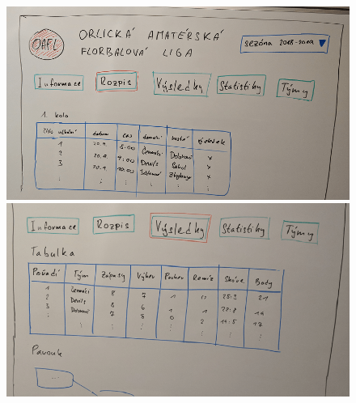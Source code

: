 \documentclass[11pt, a4paper, titlepage]{article}
\begin{document}
\begin{figure}[H]
\centering
    \begin{minipage}{.5\textwidth}
        \centering
        \includegraphics[width=.98\textwidth]{images/draft-03.png}
    \end{minipage}%
    \begin{minipage}{.5\textwidth}
        \centering
        \includegraphics[width=.98\textwidth]{images/draft-04.png}
    \end{minipage}
\end{figure}
\end{document}
